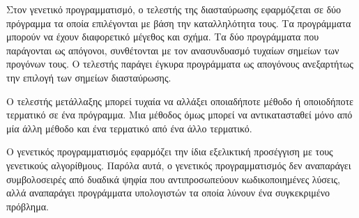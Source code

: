 Στον γενετικό προγραμματισμό, ο τελεστής της διασταύρωσης εφαρμόζεται σε δύο πρόγραμμα τα οποία επιλέγονται με βάση την καταλληλότητα τους. Τα προγράμματα μπορούν να έχουν διαφορετικό μέγεθος και σχήμα. Τα δύο προγράμματα που παράγονται ως απόγονοι, συνθέτονται με τον ανασυνδυασμό τυχαίων σημείων των προγόνων τους. Ο τελεστής παράγει έγκυρα προγράμματα ως απογόνους ανεξαρτήτως την επιλογή των σημείων διασταύρωσης.

Ο τελεστής μετάλλαξης μπορεί τυχαία να αλλάξει οποιαδήποτε μέθοδο ή οποιοδήποτε τερματικό σε ένα πρόγραμμα. Μια μέθοδος όμως μπορεί να αντικατασταθεί μόνο από μία άλλη μέθοδο και ένα τερματικό από ένα άλλο τερματικό.

Ο γενετικός προγραμματισμός εφαρμόζει την ίδια εξελικτική προσέγγιση με τους γενετικούς αλγορίθμους. Παρόλα αυτά, ο γενετικός προγραμματισμός δεν αναπαράγει συμβολοσειρές από δυαδικά ψηφία που αντιπροσωπεύουν κωδικοποιημένες λύσεις, αλλά αναπαράγει προγράμματα υπολογιστών τα οποία λύνουν ένα συγκεκριμένο πρόβλημα.

